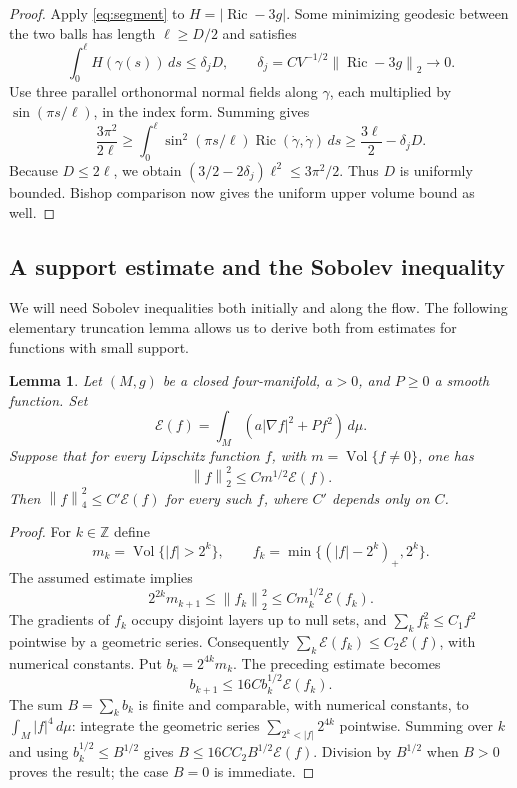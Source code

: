 \documentclass[11pt]{article}
\newtheorem{lemma}[theorem]{Lemma}
\theoremstyle{definition}
\theoremstyle{remark}
\numberwithin{equation}{section}
\DeclareMathOperator{\Ric}{Ric}
\DeclareMathOperator{\Vol}{Vol}
\newcommand{\dd}{\,d\mu}
\newcommand{\E}{\mathcal E}
\newcommand{\norm}[1]{\left\lVert #1\right\rVert}
\begin{document}
\begin{proof}
Apply \eqref{eq:segment} to $H=|\Ric-3g|$. Some minimizing geodesic
between the two balls has length $\ell\ge D/2$ and satisfies
\begin{equation}\label{eq:good-segment}
 \int_0^\ell H(\gamma(s))\,ds\le\delta_jD,
 \qquad \delta_j=CV^{-1/2}\norm{\Ric-3g}_2\longrightarrow0.
\end{equation}
Use three parallel orthonormal normal fields along $\gamma$, each
multiplied by $\sin(\pi s/\ell)$, in the index form. Summing gives
\[
 \frac{3\pi^2}{2\ell}
 \ge\int_0^\ell\sin^2(\pi s/\ell)
             \Ric(\dot\gamma,\dot\gamma)\,ds
 \ge\frac{3\ell}{2}-\delta_jD.
\]
Because $D\le2\ell$, we obtain
$ (3/2-2\delta_j)\ell^2\le3\pi^2/2$.
Thus $D$ is uniformly bounded. Bishop comparison now gives the uniform
upper volume bound as well.
\end{proof}

\subsection{A support estimate and the Sobolev inequality}

We will need Sobolev inequalities both initially and along the flow.
The following elementary truncation lemma allows us to derive both
from estimates for functions with small support.

\begin{lemma}\label{lem:truncation}
Let $(M,g)$ be a closed four-manifold, $a>0$, and $P\ge0$ a smooth
function. Set
\[
 \E(f)=\int_M(a|\nabla f|^2+Pf^2)\dd.
\]
Suppose that for every Lipschitz function $f$, with
$m=\Vol\{f\ne0\}$, one has
\begin{equation}\label{eq:support}
 \norm f_2^2\le C m^{1/2}\E(f).
\end{equation}
Then $\norm f_4^2\le C'\E(f)$ for every such $f$, where $C'$ depends
only on $C$.
\end{lemma}

\begin{proof}
For $k\in\mathbb Z$ define
\[
 m_k=\Vol\{|f|>2^k\},\qquad
 f_k=\min\{(|f|-2^k)_+,2^k\}.
\]
The assumed estimate implies
\[
 2^{2k}m_{k+1}\le\norm{f_k}_2^2
 \le C m_k^{1/2}\E(f_k).
\]
The gradients of $f_k$ occupy disjoint layers up to null sets, and
$\sum_k f_k^2\le C_1f^2$ pointwise by a geometric series. Consequently
$\sum_k\E(f_k)\le C_2\E(f)$, with numerical constants. Put
$b_k=2^{4k}m_k$. The preceding estimate becomes
\[
 b_{k+1}\le16C b_k^{1/2}\E(f_k).
\]
The sum $B=\sum_kb_k$ is finite and comparable, with numerical constants,
to $\int_M|f|^4\dd$: integrate the geometric series
$\sum_{2^k<|f|}2^{4k}$ pointwise. Summing over $k$ and using $b_k^{1/2}\le B^{1/2}$
gives $B\le16CC_2B^{1/2}\E(f)$. Division by $B^{1/2}$ when $B>0$
proves the result; the case $B=0$ is immediate.
\end{proof}
\end{document}
